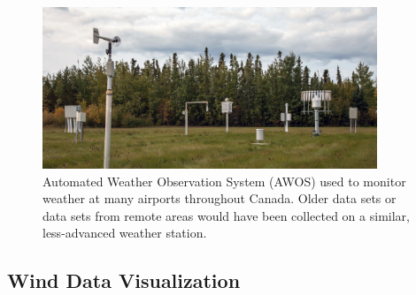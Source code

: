 \documentclass{article}
\begin{document}
\begin{figure}[h!]
\centering
\includegraphics[width=10cm]{Images/AWOS.jpg}
\caption{Automated Weather Observation System (AWOS) used to monitor weather at many airports throughout Canada. Older data sets or data sets from remote areas would have been collected on a similar, 
less-advanced weather station.}
\label{AWOS}
\end{figure}

\subsection{Wind Data Visualization}\label{Wind_data_visualization}
\end{document}
